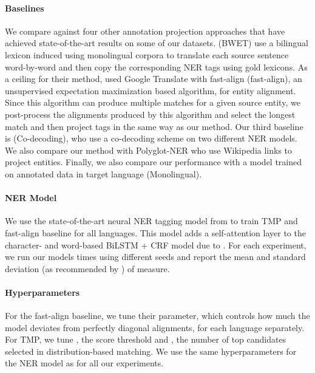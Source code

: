 \documentclass[11pt,a4paper]{article}
\begin{document}
\paragraph{Baselines}
We compare against
four other annotation projection approaches 
that have achieved state-of-the-art results on some of our datasets. 
\citet{xie2018neural} (BWET) use a bilingual lexicon 
induced using monolingual corpora \cite{conneau2017word} 
to translate each source sentence word-by-word 
and then copy the corresponding NER tags using gold lexicons.
As a ceiling for their method, \citet{mayhew2017cheap} used Google Translate 
with fast-align \cite{dyer2013fastalign} (fast-align), 
an unsupervised expectation maximization based algorithm, for entity alignment. 
Since this algorithm can produce multiple matches for a given source entity, 
we post-process the alignments produced by this algorithm 
and select the longest match and then project tags 
in the same way as our method.
Our third baseline is \citet{ni2017weakly} (Co-decoding), 
who use a co-decoding scheme on two different NER models.
We also compare our method with Polyglot-NER \cite{al2015polyglot} 
who use Wikipedia links to project entities. 
Finally, we also compare our performance with a model trained on annotated data in target language (Monolingual).






\paragraph{NER Model}
We use the state-of-the-art neural NER tagging model from \cite{xie2018neural} 
to train TMP and fast-align baseline for all languages. 
This model adds a self-attention layer to the 
character- and word-based BiLSTM + CRF model due to \citet{lample2016neural}. 
For each experiment, we run our models  times using different seeds 
and report the mean and standard deviation 
(as recommended by \citet{reimers2017reporting}) of  measure.






\paragraph{Hyperparameters}
For the fast-align baseline, we tune their  parameter,
which controls how much the model deviates 
from perfectly diagonal alignments, for each language separately. 
For TMP, we tune , the score threshold and , the number of top candidates selected in distribution-based matching.  
We use the same hyperparameters for the NER model as \citet{xie2018neural} 
for all our experiments.
\end{document}
